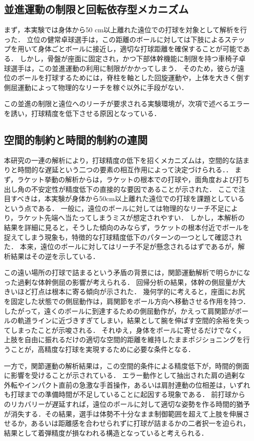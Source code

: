 \documentclass[../main]{subfiles}
\begin{document}
\subsection{並進運動の制限と回転依存型メカニズム}
まず，本実験では身体から50 cm以上離れた遠位での打球を対象として解析を行った．
立位の健常卓球選手は，この距離のボールに対しては下肢によるステップを用いて身体ごとボールに接近し，適切な打球距離を確保することが可能である．
しかし，骨盤が座面に固定され，かつ下部体幹機能に制限を持つ車椅子卓球選手は，この並進運動の利用に制限がかかってしまう．
そのため，彼らが遠位のボールを打球するためには，脊柱を軸とした回旋運動や，上体を大きく倒す側屈運動によって物理的なリーチを稼ぐ以外に手段がない．

この並進の制限と遠位へのリーチが要求される実験環境が，次項で述べるエラーを誘い，打球精度を低下させる原因となっている．

\subsection{空間的制約と時間的制約の連関}
本研究の一連の解析により，打球精度の低下を招くメカニズムは，空間的な詰まりと時間的な遅延という二つの要素の相互作用によって決定づけられる．．
まず，ラケット挙動の解析からは，ラケットの根本での打球や，面角度および打ち出し角の不安定性が精度低下の直接的な要因であることが示された．
ここで注目すべきは，本実験が身体から50cm以上離れた遠位での打球を課題としているという点である．
一般に，遠位のボールに対しては物理的なリーチ不足により，ラケット先端へ当たってしまうミスが想定されやすい．
しかし，本解析の結果を詳細に見ると，そうした傾向のみならず，ラケットの根本付近でボールを捉えてしまう現象も，特徴的な打球精度低下のパターンの一つとして確認された．
本来，遠位のボールに対してはリーチ不足が懸念されるはずであるが，解析結果はその逆を示している．

この遠い場所の打球で詰まるという矛盾の背景には，関節運動解析で明らかになった過剰な体幹側屈の影響が考えられる．
回帰分析の結果，体幹の側屈量が大きいほど打点は根本に寄る傾向が示された．
幾何学的に考えると，座面にお尻を固定した状態での側屈動作は，肩関節をボール方向へ移動させる作用を持つ．
したがって，遠くのボールに到達するための側屈動作が，かえって肩関節がボールの軌道ラインに近づきすぎてしまい，結果として腕を伸ばす空間的余裕を失ってしまったことが示唆される．
それゆえ，身体をボールに寄せるだけでなく，上肢を自由に振れるだけの適切な空間的距離を維持したままポジショニングを行うことが，高精度な打球を実現するために必要な条件となる．

一方で，関節運動の解析結果は，この空間的条件による精度低下が，時間的側面に影響を受けることが示されている．
エラー動作として抽出された肩の過剰な外転やインパクト直前の急激な手首操作，あるいは肩肘連動の位相差は，いずれも打球までの準備時間が不足していることに起因する現象である．
前打球からのリカバリーが遅延すれば，遠位のボールに対して適切な姿勢を作る時間的猶予が消失する．その結果，選手は体勢不十分なまま制御範囲を超えて上肢を伸展させるか，あるいは距離感を合わせられずに打球が詰まるかの二者択一を迫られ，結果として着弾精度が損なわれる構造となっていると考えられる．
\end{document}
